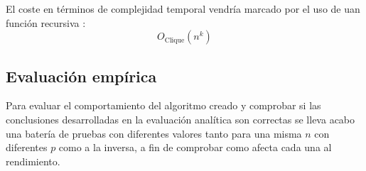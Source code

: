El coste en términos de complejidad temporal vendría marcado por el uso de uan función recursiva : 
\begin{equation}
    O_{\mathrm{Clique}}(n^k) 
\end{equation}



\subsection*{Evaluación empírica}

Para evaluar el comportamiento del algoritmo creado y comprobar si las conclusiones desarrolladas en la evaluación analítica son correctas se lleva acabo una batería de pruebas con diferentes valores tanto para una misma $n$ con diferentes $p$ como a la inversa, a fin de comprobar como afecta cada una al rendimiento.

